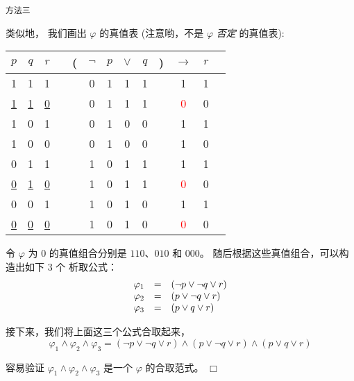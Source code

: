 \documentclass[UTF8,12pt,a4paper]{ctexart}
\begin{document}
\vspace{1em}

\noindent\texttt{方法三}

类似地，
我们画出 $\varphi$ 的真值表 (注意哟，不是 $\varphi$ \textit{否定} 的真值表):

\begin{center}
	\begin{tabular}{@{ }c@{ }@{ }c@{ }@{ }c | c@{ }@{}c@{}@{ }c@{ }@{ }c@{ }@{ }c@{ }@{ }c@{ }@{}c@{}@{ }c@{ }@{ }c@{ }@{ }c}
		$p$ & $q$ & $r$ &  & ( & $\lnot$ & $p$ & $\lor$ & $q$ & ) & $\rightarrow$ & $r$ & \\
		\hline 
		1 & 1 & 1 &  &  & 0 & 1 & 1 & 1 &  &                  1 & 1 & \\
		\underline{1} & \underline{1} & \underline{0} &  &  & 0 & 1 & 1 & 1 &  & \textcolor{red}{0} & 0 & \\
		1 & 0 & 1 &  &  & 0 & 1 & 0 & 0 &  &                 1  & 1 & \\
		1 & 0 & 0 &  &  & 0 & 1 & 0 & 0 &  & 				 1 & 0 & \\
		0 & 1 & 1 &  &  & 1 & 0 & 1 & 1 &  & 				 1 & 1 & \\
		\underline{0} & \underline{1} & \underline{0} &  &  & 1 & 0 & 1 & 1 &  & \textcolor{red}{0} & 0 & \\
		0 & 0 & 1 &  &  & 1 & 0 & 1 & 0 &  & 				 1 & 1 & \\
		\underline{0} & \underline{0} & \underline{0} &  &  & 1 & 0 & 1 & 0 &  & \textcolor{red}{0} & 0 & \\
	\end{tabular}
\end{center}

令 $\varphi$ 为 $0$ 的真值组合分别是
$110$、$010$ 和 $000$。
随后根据这些真值组合，可以构造出如下 3 个 析取公式：
\[\begin{array}{l l l}
	\varphi_1 
	&=&
	(\neg p \lor \neg q \lor r) \\ 
	
	\varphi_2
	&=&
	( p \lor \neg q \lor r) \\
	
	\varphi_3
	&=&
	( p \lor  q \lor r)  \\
\end{array}\]

接下来，我们将上面这三个公式合取起来，
\[
\varphi_1 \land \varphi_2 \land \varphi_3 = ( \neg p \lor \neg q \lor  r) \land  ( p \lor \neg q \lor r) \land  ( p \lor  q \lor r)
\]

容易验证  $\varphi_1 \land \varphi_2 \land \varphi_3$ 是一个 $\varphi$ 的合取范式。
\hfill $\Box$
\end{document}
